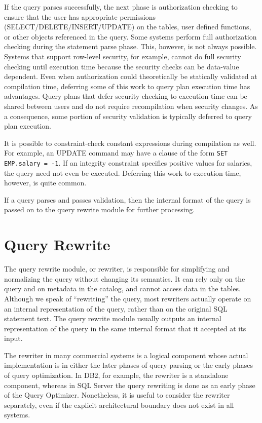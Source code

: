 \documentclass[b5paper,11pt,twoside,openright]{book}
\begin{document}
If the query parses successfully, the next phase is authorization
checking to ensure that the user has appropriate permissions
(SELECT/DELETE/INSERT/UPDATE) on the tables, user defined functions, or
other objects referenced in the query. Some systems perform full
authorization checking during the statement parse phase. This, however,
is not always possible. Systems that support row-level security, for
example, cannot do full security checking until execution time because
the security checks can be data-value dependent. Even when authorization
could theoretically be statically validated at compilation time,
deferring some of this work to query plan execution time has advantages.
Query plans that defer security checking to execution time can be shared
between users and do not require recompilation when security changes. As
a consequence, some portion of security validation is typically deferred
to query plan execution.

It is possible to constraint-check constant expressions during
compilation as well. For example, an UPDATE command may have a clause of
the form \texttt{SET EMP.salary = -1}. If an integrity constraint specifies
positive values for salaries, the query need not even be executed.
Deferring this work to execution time, however, is quite common.

If a query parses and passes validation, then the internal format of the
query is passed on to the query rewrite module for further processing.

\hypertarget{query-rewrite}{%
\section{Query Rewrite}\label{query-rewrite}}

The query rewrite module, or rewriter, is responsible for simplifying
and normalizing the query without changing its semantics. It can rely
only on the query and on metadata in the catalog, and cannot access data
in the tables. Although we speak of ``rewriting'' the query, most
rewriters actually operate on an internal representation of the query,
rather than on the original SQL statement text. The query rewrite module
usually outputs an internal representation of the query in the same
internal format that it accepted at its input.

The rewriter in many commercial systems is a logical component whose
actual implementation is in either the later phases of query parsing or
the early phases of query optimization. In DB2, for example, the
rewriter is a standalone component, whereas in SQL Server the query
rewriting is done as an early phase of the Query Optimizer. Nonetheless,
it is useful to consider the rewriter separately, even if the explicit
architectural boundary does not exist in all systems.
\end{document}
